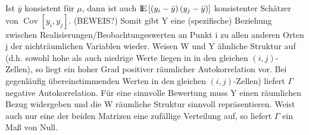 Ist $\bar{y}$ konsistent für $\mu$, dann ist auch ${\rm I\!E}\left[ \left(y_i-\bar{y}\right)\left(y_j-\bar{y}\right) \right]$ 
konsistenter Schätzer von $\operatorname{Cov} \left[ y_i , y_j \right]$. (BEWEIS?)
Somit gibt Y eine (spezifische) Beziehung zwischen Realisierungen/Beobachtungeswerten an Punkt i 
zu allen anderen Orten j der nichträumlichen Variablen wieder. 
Weisen W und Y ähnliche Struktur auf (d.h. sowohl hohe als auch niedrige Werte liegen in in den 
gleichen $\left(i,j\right)$-Zellen), so liegt ein hoher Grad positiver räumlicher Autokorrelation vor. 
Bei gegenläufig übereinstimmenden Werten in den gleichen $(i,j)$-Zellen) liefert $\Gamma$ negative Autokorrelation. 
Für eine sinnvolle Bewertung muss Y einen räumlichen Bezug widergeben und die W räumliche Struktur sinnvoll repräsentieren. 
Weist auch nur eine der beiden Matrizen eine zufällige Verteilung auf, so liefert $\Gamma$ ein Maß von Null.

